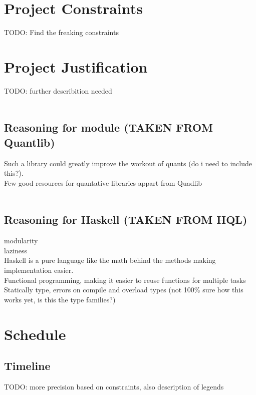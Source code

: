 \section{Project Constraints}

TODO: Find the freaking constraints

\section{Project Justification}

TODO: further describition needed\\
\\
\subsection{Reasoning for module (TAKEN FROM Quantlib\cite{QULI})}
Such a library could greatly improve the workout of quants (do i need to include this?).\\
Few good resources for quantative libraries appart from Quadlib\\
\\
\subsection{Reasoning for Haskell (TAKEN FROM HQL\cite{HQL})}
modularity\\
laziness\\
Haskell is a pure language like the math behind the methods making implementation easier.\\
Functional programming, making it easier to reuse functions for multiple tasks\\
Statically type, errors on compile and overload types (not 100\% sure how this works yet, is this the type families?)\\


\section{Schedule}

\subsection{Timeline}

TODO: more precision based on constraints, also description of legends


